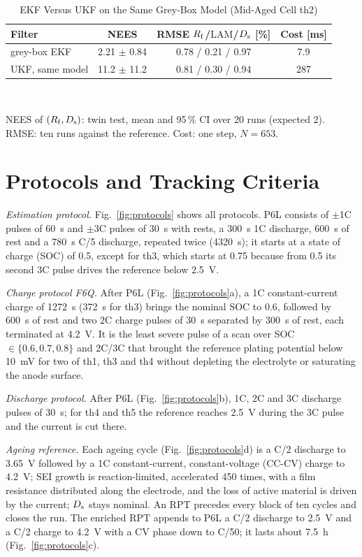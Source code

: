 \documentclass[journal]{IEEEtran}
\newcommand{\LAM}{\mathrm{LAM}}\newcommand{\LLI}{\mathrm{LLI}}\newcommand{\phipl}{\phi_{\mathrm{pl}}}
\begin{document}
\begin{table}[t]
\centering
\caption{EKF Versus UKF on the Same Grey-Box Model (Mid-Aged Cell th2)}
\label{tab:filters}
\footnotesize\setlength{\tabcolsep}{3pt}
\begin{tabular}{@{}lccc@{}}
\toprule
Filter & NEES & RMSE $R_{\mathrm{f}}$/$\LAM$/$D_{\mathrm{s}}$ [\%] & Cost [ms]\\
\midrule
grey-box EKF & 2.21 $\pm$ 0.84 & 0.78 / 0.21 / 0.97 & 7.9\\
UKF, same model & 11.2 $\pm$ 11.2 & 0.81 / 0.30 / 0.94 & 287\\
\bottomrule
\end{tabular}\\[2pt]
\parbox{\columnwidth}{\footnotesize NEES of $(R_{\mathrm{f}},D_{\mathrm{s}})$: twin test, mean and 95\,\% CI over 20 runs (expected 2). RMSE: ten runs against the reference. Cost: one step, $N=653$.}
\end{table}

\section{Protocols and Tracking Criteria}\label{app:protocols}
\emph{Estimation protocol.} Fig.~\ref{fig:protocols} shows all protocols. P6L consists of $\pm$1C pulses of \SI{60}{\second} and $\pm$3C pulses of \SI{30}{\second} with rests, a \SI{300}{\second} 1C discharge, \SI{600}{\second} of rest and a \SI{780}{\second} C/5 discharge, repeated twice (\SI{4320}{\second}); it starts at a state of charge (SOC) of 0.5, except for th3, which starts at 0.75 because from 0.5 its second 3C pulse drives the reference below \SI{2.5}{\volt}.

\emph{Charge protocol F6Q.} After P6L (Fig.~\ref{fig:protocols}a), a 1C constant-current charge of \SI{1272}{\second} (\SI{372}{\second} for th3) brings the nominal SOC to 0.6, followed by \SI{600}{\second} of rest and two 2C charge pulses of \SI{30}{\second} separated by \SI{300}{\second} of rest, each terminated at \SI{4.2}{\volt}. It is the least severe pulse of a scan over SOC $\in\{0.6,0.7,0.8\}$ and 2C/3C that brought the reference plating potential below \SI{10}{\milli\volt} for two of th1, th3 and th4 without depleting the electrolyte or saturating the anode surface.

\emph{Discharge protocol.} After P6L (Fig.~\ref{fig:protocols}b), 1C, 2C and 3C discharge pulses of \SI{30}{\second}; for th4 and th5 the reference reaches \SI{2.5}{\volt} during the 3C pulse and the current is cut there.

\emph{Ageing reference.} Each ageing cycle (Fig.~\ref{fig:protocols}d) is a C/2 discharge to \SI{3.65}{\volt} followed by a 1C constant-current, constant-voltage (CC-CV) charge to \SI{4.2}{\volt}; SEI growth is reaction-limited, accelerated 450 times, with a film resistance distributed along the electrode, and the loss of active material is driven by the current; $D_{\mathrm{s}}$ stays nominal. An RPT precedes every block of ten cycles and closes the run. The enriched RPT appends to P6L a C/2 discharge to \SI{2.5}{\volt} and a C/2 charge to \SI{4.2}{\volt} with a CV phase down to C/50; it lasts about \SI{7.5}{\hour} (Fig.~\ref{fig:protocols}c).
\end{document}
